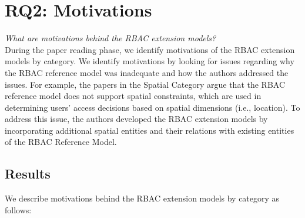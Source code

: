 \section{RQ2: Motivations} \label{sec:motivations}

\textit{What are motivations behind the RBAC extension models?}
\\

During the paper reading phase, we identify motivations of the RBAC extension models by category. We identify motivations by looking for issues regarding why the RBAC reference model was inadequate and how the authors addressed the issues. For example, the papers in the Spatial Category argue that the RBAC reference model does not support spatial constraints, which are used in determining users' access decisions based on spatial dimensions (i.e., location). To address this issue, the authors developed the RBAC extension models by incorporating additional spatial entities and their relations with existing entities of the RBAC Reference Model. 


\subsection{Results}

We describe motivations behind the RBAC extension models by category as follows:

